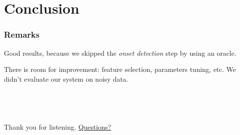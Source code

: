 \documentclass{beamer}
\begin{document}
\begin{frame}
\begin{center}
%

        \end{center}
    \end{frame}

    \section{Conclusion}

    \begin{frame}
        \frametitle{Remarks}
        Good results, because we skipped the \emph{onset detection} step by using an oracle.

        There is room for improvement: feature selection, parameters tuning, etc. We didn't evaluate our system on noisy data.
    \end{frame}
   
    \section{}
    \begin{frame}
        \frametitle{~}

        \begin{center}
            Thank you for listening.
            \underline{Questions?}
        \end{center}
    \end{frame}
\end{document}
